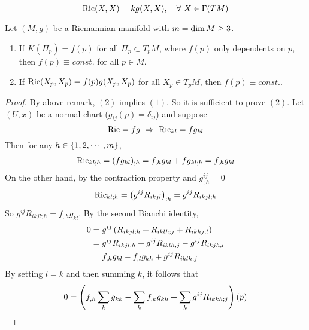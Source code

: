 \begin{enumerate}[label=\arabic{*}.]
\begin{rmk}
		\begin{equation*}
			\operatorname{Ric}(X,X) = kg(X,X),\quad \forall~X \in \Gamma(TM)
		\end{equation*}
	\end{rmk}
	\begin{thm}[Schur]
		Let $(M,g)$ be a Riemannian manifold with $m = \operatorname{dim}M \geq 3$.
		\begin{enumerate}[label=(\arabic{*})]
			\item If $K(\Pi_p) = f(p)$ for all $\Pi_p \subset T_pM$, where $f(p)$ only dependents on $p$, then $f(p) \equiv const.$ for all $p \in M$.
			\item If $\operatorname{Ric}(X_p,X_p) = f(p)g(X_p,X_p)$ for all $X_p \in T_pM$, then $f(p) \equiv const.$.
		\end{enumerate}
	\end{thm}
	\begin{proof}
		By above remark, $(2)$ implies $(1)$. So it is sufficient to prove $(2)$. Let $(U,x)$ be a normal chart ($g_{ij}(p)=\delta_{ij}$) and suppose
		\begin{equation*}
			\operatorname{Ric} = fg ~\Rightarrow~ \operatorname{Ric}_{kl} = fg_{kl}
		\end{equation*}
		Then for any $h \in \left\{1,2,\cdots,m\right\}$,
		\begin{equation*}
			\begin{aligned}
				\operatorname{Ric}_{kl;h} = (fg_{kl})_{;h} = f_{,h}g_{kl}+fg_{kl;h} = f_{,h}g_{kl}
			\end{aligned}
		\end{equation*}
		On the other hand, by the contraction property and $g^{ij}_{;h}=0$
		\begin{equation*}
			\operatorname{Ric}_{kl;h} =\left(g^{ij}R_{ikjl}\right)_{;h} = g^{ij}R_{ikjl;h}
		\end{equation*}
		So $g^{ij}R_{ikjl;h} = f_{,h}g_{kl}$. By the second Bianchi identity,
		\begin{equation*}
			\begin{aligned}
				0&=g^{ij}\left(R_{ikjl;h}+R_{iklh;j}+R_{ikhj;l}\right) \\
				&= g^{ij}R_{ikjl;h} + g^{ij}R_{iklh;j} - g^{ij}R_{ikjh;l} \\
				&= f_{,h}g_{kl} - f_{,l}g_{kh} + g^{ij}R_{iklh;j}
			\end{aligned}
		\end{equation*}
		By setting $l=k$ and then summing $k$, it follows that
		\begin{equation*}
			\begin{aligned}
				0 &= \bc{f_{,h}\sum_kg_{kk} - \sum_kf_{,k}g_{kh} + \sum_k g^{ij} R_{ikkh;j}}(p) \\

\end{aligned}
\end{equation*}
\end{proof}
\end{enumerate}
